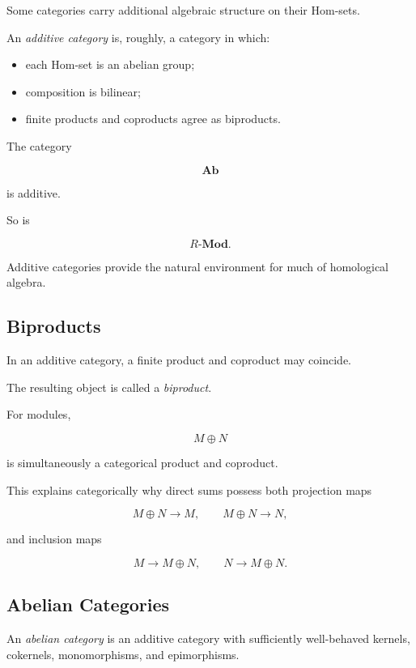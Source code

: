 Some categories carry additional algebraic structure on their Hom-sets.

An \emph{additive category} is, roughly, a category in which:

\begin{itemize}
    \item each Hom-set is an abelian group;
    \item composition is bilinear;
    \item finite products and coproducts agree as biproducts.
\end{itemize}

The category

\[ \mathbf{Ab} \]

is additive.

So is

\[ R\text{-}\mathbf{Mod}. \]

Additive categories provide the natural environment for much of homological
algebra.

\subsection{Biproducts}
\label{subsec:biproducts}

In an additive category, a finite product and coproduct may coincide.

The resulting object is called a \emph{biproduct}.

For modules,

\[ M\oplus N \]

is simultaneously a categorical product and coproduct.

This explains categorically why direct sums possess both projection maps

\[ M\oplus N\to M,\qquad M\oplus N\to N, \]

and inclusion maps

\[ M\to M\oplus N,\qquad N\to M\oplus N. \]

\subsection{Abelian Categories}
\label{subsec:abelian-categories}

An \emph{abelian category} is an additive category with sufficiently
well-behaved kernels, cokernels, monomorphisms, and epimorphisms.

